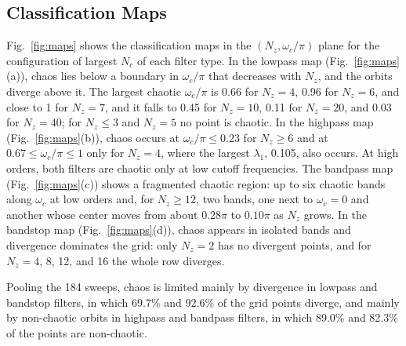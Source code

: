 \documentclass[journal]{IEEEtran}
\begin{document}
\subsection{Classification Maps}\label{sub:maps}
Fig.~\ref{fig:maps} shows the classification maps in the $(N_z,\omega_c/\pi)$
plane for the configuration of largest $N_c$ of each filter type. In the lowpass
map (Fig.~\ref{fig:maps}(a)), chaos lies below a boundary in $\omega_c/\pi$
that decreases with $N_z$, and the orbits diverge above it. The largest chaotic
$\omega_c/\pi$ is 0.66 for $N_z=4$, 0.96 for $N_z=6$, and close to 1 for $N_z=7$, and
it falls to 0.45 for $N_z=10$, 0.11 for $N_z=20$, and 0.03 for $N_z=40$; for
$N_z\le3$ and $N_z=5$ no point is chaotic. In the highpass map
(Fig.~\ref{fig:maps}(b)), chaos occurs at $\omega_c/\pi\le0.23$ for $N_z\ge6$
and at $0.67\le\omega_c/\pi\le1$ only for $N_z=4$, where the largest
$\lambda_1$, 0.105, also occurs. At high orders, both filters are chaotic only
at low cutoff frequencies. The bandpass map (Fig.~\ref{fig:maps}(c)) shows a fragmented chaotic region:
up to six chaotic bands along $\omega_c$ at low orders and, for $N_z\ge12$, two
bands, one next to $\omega_c=0$ and another whose center moves from about
$0.28\pi$ to $0.10\pi$ as $N_z$ grows. In the bandstop map
(Fig.~\ref{fig:maps}(d)), chaos appears in isolated bands and divergence
dominates the grid: only $N_z=2$ has no divergent points, and for $N_z=4$, 8,
12, and 16 the whole row diverges.

Pooling the 184 sweeps, chaos is limited mainly by divergence in lowpass and
bandstop filters, in which 69.7\% and 92.6\% of the grid points diverge, and
mainly by non-chaotic orbits in highpass and bandpass filters, in which 89.0\%
and 82.3\% of the points are non-chaotic.
\end{document}
